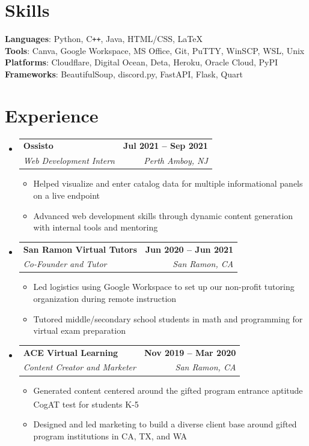 \documentclass[letterpaper,11pt]{article}
\makeatletter
\newcommand{\resumeItem}[1]{
  \item\small{
    {#1 \vspace{-2pt}}
  }
}
\newcommand{\resumeSubheading}[4]{
  \vspace{-2pt}\item
    \begin{tabular*}{1.0\textwidth}[t]{l@{\extracolsep{\fill}}r}
      \textbf{#1} & \textbf{\small #2} \\
      \textit{\small#3} & \textit{\small #4} \\
    \end{tabular*}\vspace{-7pt}
}
\newcommand{\resumeSubHeadingListStart}{\begin{itemize}[leftmargin=0.0in, label={}]}
\newcommand{\resumeSubHeadingListEnd}{\end{itemize}}
\newcommand{\resumeItemListStart}{\begin{itemize}}
\newcommand{\resumeItemListEnd}{\end{itemize}\vspace{-5pt}}
\makeatother
\begin{document}
\section{Skills}
\begin{itemize}[leftmargin=0.15in, label={}]
	\small{\item{
		            \textbf{Languages}{: Python, C\texttt{++}, Java, HTML/CSS, \LaTeX} \\
		            \textbf{Tools}{: Canva, Google Workspace, MS Office, Git, PuTTY, WinSCP, WSL, Unix} \\
		            \textbf{Platforms}{: Cloudflare, Digital Ocean, Deta, Heroku, Oracle Cloud, PyPI} \\
		            \textbf{Frameworks}{: BeautifulSoup, discord.py, FastAPI, Flask, Quart} \\
		      }}
\end{itemize}
\vspace{-15pt}

\section{Experience}
\resumeSubHeadingListStart

\resumeSubheading
{Ossisto}{Jul 2021 -- Sep 2021}
{Web Development Intern}{Perth Amboy, NJ}
\resumeItemListStart
\resumeItem{Helped visualize and enter catalog data for multiple informational panels on a live endpoint}
\resumeItem{Advanced web development skills through dynamic content generation with internal tools and mentoring}
\resumeItemListEnd

\resumeSubheading
{San Ramon Virtual Tutors}{Jun 2020 -- Jun 2021}
{Co-Founder and Tutor}{San Ramon, CA}
\resumeItemListStart
\resumeItem{Led logistics using Google Workspace to set up our non-profit tutoring organization during remote instruction}
\resumeItem{Tutored middle/secondary school students in math and programming for virtual exam preparation}
\resumeItemListEnd

\resumeSubheading
{ACE Virtual Learning}{Nov 2019 -- Mar 2020}
{Content Creator and Marketer}{San Ramon, CA}
\resumeItemListStart
\resumeItem{Generated content centered around the gifted program entrance aptitude CogAT\textsuperscript{\textregistered} test for students K-5}
\resumeItem{Designed and led marketing to build a diverse client base around gifted program institutions in CA, TX, and WA}
\resumeItemListEnd

\resumeSubHeadingListEnd
\vspace{-10pt}
\end{document}
